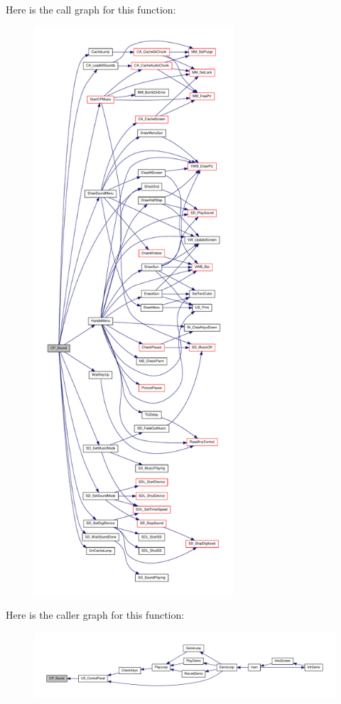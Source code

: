 Here is the call graph for this function:
\nopagebreak
\begin{figure}[H]
\begin{center}
\leavevmode
\includegraphics[height=600pt]{WL__MENU_8H_a33c03c428f4fe132d1e5006416422ed4_cgraph}
\end{center}
\end{figure}




Here is the caller graph for this function:
\nopagebreak
\begin{figure}[H]
\begin{center}
\leavevmode
\includegraphics[width=400pt]{WL__MENU_8H_a33c03c428f4fe132d1e5006416422ed4_icgraph}
\end{center}
\end{figure}


